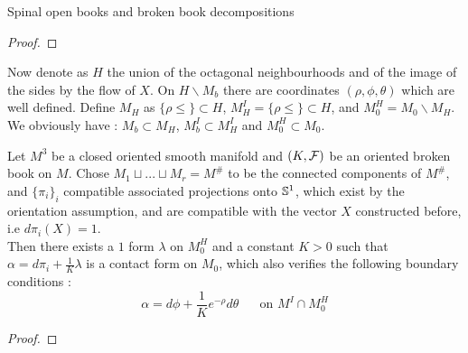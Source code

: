 \documentclass[../main.tex]{subfiles}
\begin{document}
\begin{section}{Spinal open books and broken book decompositions}
\begin{proof}
\end{proof}

\color{red}
Now denote as $H$ the union of the octagonal neighbourhoods and of the image of the sides by the flow of $X$. On $H\backslash M_b$ there are coordinates $(\rho,\phi,\theta)$ which are well defined. Define $M_H$ as $\{\rho\leq \}\subset H$, $M^I _H = \{\rho \leq \}\subset H$, and $M^H_0 = M_0\backslash M_H$. We obviously have : $M_b\subset M_H$, $M_b^I\subset M_H^I$ and $M_0^H\subset M_0$.
\color{black}

\begin{lemma}
Let $M^3$ be a closed oriented smooth manifold and $(K,\mathcal{F})$ be an oriented broken book on $M$.
Chose $M_1\sqcup ...\sqcup M_r = M^\#$ to be the connected components of $M^\#$, and $\{\pi_i\}_i$ compatible associated projections onto $\mathbb{S}^1$, which exist by the orientation assumption, and are compatible with the vector $X$ constructed before, i.e $d\pi _i(X) = 1$.\\
Then there exists a $1$ form $\lambda$ on $M_0^H$ and a constant $K> 0$ such that $\alpha = d\pi_i + \frac{1}{K}\lambda$ is a contact form on $M_0$, which also verifies the following boundary conditions : $$\alpha = d\phi + \frac{1}{K}e^{-\rho}d\theta\,\,\,\;\;\;\text{ on } M^I\cap M_0^H$$
\end{lemma}


\begin{proof}


\end{proof}
\end{section}
\end{document}
